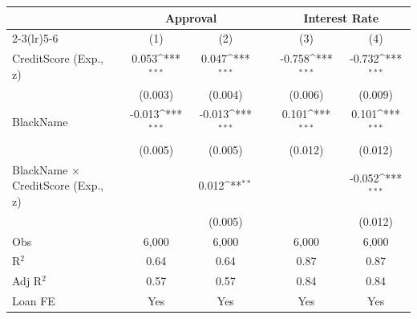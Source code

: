 {\def\sym#1{\ifmmode^{#1}\else\(^{#1}\)\fi}
\begin{tabular}{l*{5}{c}} \toprule
                &\multicolumn{2}{c}{Approval}         &         &\multicolumn{2}{c}{Interest Rate}    \\\cmidrule(lr){2-3}\cmidrule(lr){5-6}
                &\multicolumn{1}{c}{(1)}         &\multicolumn{1}{c}{(2)}         &         &\multicolumn{1}{c}{(3)}         &\multicolumn{1}{c}{(4)}         \\
\midrule
CreditScore (Exp., z)&    0.053\sym{***}&    0.047\sym{***}&         &   -0.758\sym{***}&   -0.732\sym{***}\\
                &  (0.003)         &  (0.004)         &         &  (0.006)         &  (0.009)         \\
BlackName       &   -0.013\sym{***}&   -0.013\sym{***}&         &    0.101\sym{***}&    0.101\sym{***}\\
                &  (0.005)         &  (0.005)         &         &  (0.012)         &  (0.012)         \\
BlackName $\times$ CreditScore (Exp., z)&                  &    0.012\sym{**} &         &                  &   -0.052\sym{***}\\
                &                  &  (0.005)         &         &                  &  (0.012)         \\
\midrule
Obs             &    6,000         &    6,000         &         &    6,000         &    6,000         \\
R$^2$           &     0.64         &     0.64         &         &     0.87         &     0.87         \\
Adj R$^2$       &     0.57         &     0.57         &         &     0.84         &     0.84         \\
Loan FE         &      Yes         &      Yes         &         &      Yes         &      Yes         \\
\bottomrule
\end{tabular}
}
